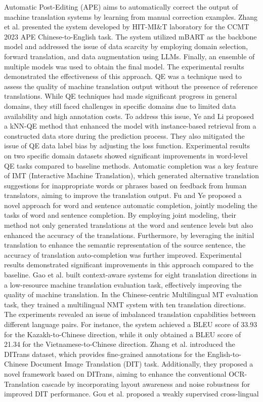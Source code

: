 \documentclass[acmsmall]{acmart}
\begin{document}
Automatic Post-Editing (APE) aims to automatically correct the output of machine translation systems by learning from manual correction examples. Zhang et al. \cite{10.1007/978-981-99-7894-66} presented the system developed by HIT-MI\&T laboratory for the CCMT 2023 APE Chinese-to-English task. The system utilized mBART as the backbone model and addressed the issue of data scarcity by employing domain selection, forward translation, and data augmentation using LLMs. Finally, an ensemble of multiple models was used to obtain the final model. The experimental results demonstrated the effectiveness of this approach. QE was a technique used to assess the quality of machine translation output without the presence of reference translations. While QE techniques had made significant progress in general domains, they still faced challenges in specific domains due to limited data availability and high annotation costs. To address this issue, Ye and Li \cite{10.1007/978-981-99-7894-67} proposed a kNN-QE method that enhanced the model with instance-based retrieval from a constructed data store during the prediction process. They also mitigated the issue of QE data label bias by adjusting the loss function. Experimental results on two specific domain datasets showed significant improvements in word-level QE tasks compared to baseline methods. Automatic completion was a key feature of IMT (Interactive Machine Translation), which generated alternative translation suggestions for inappropriate words or phrases based on feedback from human translators, aiming to improve the translation output. Fu and Ye \cite{10.1007/978-981-99-7894-68} proposed a novel approach for word and sentence automatic completion, jointly modeling the tasks of word and sentence completion. By employing joint modeling, their method not only generated translations at the word and sentence levels but also enhanced the accuracy of the translations. Furthermore, by leveraging the initial translation to enhance the semantic representation of the source sentence, the accuracy of translation auto-completion was further improved. Experimental results demonstrated significant improvements in this approach compared to the baseline. Gao et al. \cite{10.1007/978-981-99-7894-69} built context-aware systems for eight translation directions in a low-resource machine translation evaluation task, effectively improving the quality of machine translation. In the Chinese-centric Multilingual MT evaluation task, they trained a multilingual NMT system with ten translation directions. The experiments revealed an issue of imbalanced translation capabilities between different language pairs. For instance, the system achieved a BLEU score of 33.93 for the Kazakh-to-Chinese direction, while it only obtained a BLEU score of 21.34 for the Vietnamese-to-Chinese direction. Zhang et al. \cite{10.1007/978-981-99-7894-610} introduced the DITrans dataset, which provides fine-grained annotations for the English-to-Chinese Document Image Translation (DIT) task. Additionally, they proposed a novel framework based on DITrans, aiming to enhance the conventional OCR-Translation cascade by incorporating layout awareness and noise robustness for improved DIT performance. Gou et al. \cite{10.1007/978-981-99-7894-611} proposed a weakly supervised cross-lingual 
\end{document}
